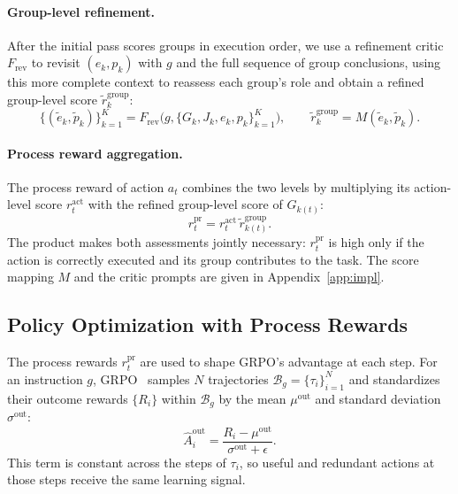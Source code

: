 \paragraph{Group-level refinement.}
After the initial pass scores groups in execution order, we use a refinement critic $F_{\mathrm{rev}}$ to revisit $(e_k,p_k)$ with $g$ and the full sequence of group conclusions, using this more complete context to reassess each group's role and obtain a refined group-level score $\tilde{r}_k^{\mathrm{group}}$:
\begin{equation}
    \{(\tilde{e}_k, \tilde{p}_k)\}_{k=1}^{K}
    = F_{\mathrm{rev}}\bigl(g, \{G_k, J_k, e_k, p_k\}_{k=1}^{K}\bigr),
    \qquad
    \tilde{r}_k^{\mathrm{group}}
    = M(\tilde{e}_k, \tilde{p}_k).
\end{equation}

\paragraph{Process reward aggregation.}
The process reward of action $a_t$ combines the two levels by multiplying its action-level score $r_t^{\mathrm{act}}$ with the refined group-level score of $G_{k(t)}$:
\begin{equation}
    r_t^{\mathrm{pr}}
    = r_t^{\mathrm{act}}\,\tilde{r}_{k(t)}^{\mathrm{group}}.
\end{equation}
The product makes both assessments jointly necessary: $r_t^{\mathrm{pr}}$ is high only if the action is correctly executed and its group contributes to the task.
The score mapping $M$ and the critic prompts are given in Appendix~\ref{app:impl}.

\subsection{Policy Optimization with Process Rewards}
\label{sec:pr-grpo}

The process rewards $r_t^{\mathrm{pr}}$ are used to shape GRPO's advantage at each step. For an instruction $g$, GRPO~\cite{shao2024deepseekmath} samples $N$ trajectories $\mathcal{B}_g=\{\tau_i\}_{i=1}^{N}$ and standardizes their outcome rewards $\{R_i\}$ within $\mathcal{B}_g$ by the mean $\mu^{\mathrm{out}}$ and standard deviation $\sigma^{\mathrm{out}}$:
\begin{equation}
    \hat{A}_i^{\mathrm{out}}
    = \frac{R_i-\mu^{\mathrm{out}}}{\sigma^{\mathrm{out}}+\epsilon}.
\end{equation}
This term is constant across the steps of $\tau_i$, so useful and redundant actions at those steps receive the same learning signal.

